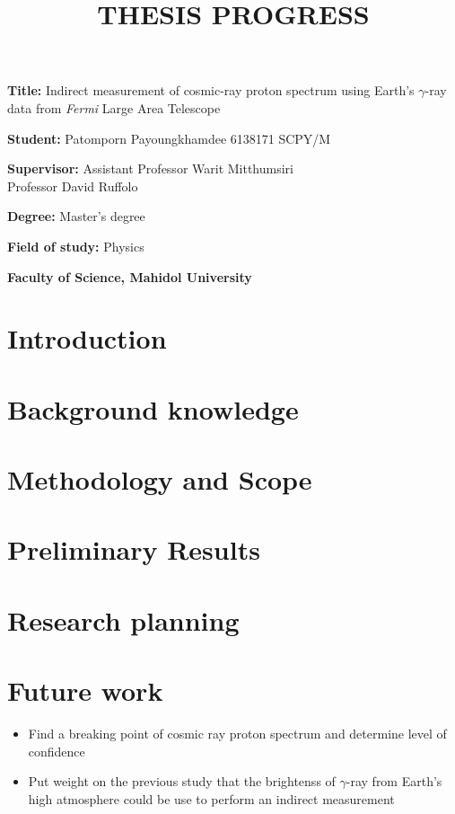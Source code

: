 \documentclass[12pt, a4paper]{article}
\title{THESIS PROGRESS}
\author{}
\date{}
\newcommand{\namelistlabel}[1]{\mbox{#1}\hfil}
\newenvironment{namelist}[1]{%
\begin{list}{}
    {
        \let\makelabel\namelistlabel
        \settowidth{\labelwidth}{#1}
        \setlength{\leftmargin}{1.1\labelwidth}
    }
  }{%
\end{list}}
\begin{document}
\maketitle

\begin{namelist}{xxxxxxxxxxxx}
\item[{\bf Title:}]
Indirect measurement of cosmic-ray proton spectrum using Earth's $\gamma$-ray data from \textit{Fermi} Large Area Telescope
\item[{\bf Student:}]
	Patomporn Payoungkhamdee 6138171 SCPY/M
\item[{\bf Supervisor:}]
  Assistant Professor Warit Mitthumsiri \\
  Professor David Ruffolo
\item[{\bf Degree:}]
	Master's degree
\item[{\bf Field of study:}]
	Physics
\item[{\bf Faculty of Science,  Mahidol University }]
\end{namelist}

\section{Introduction}


\section{Background knowledge}


\section{Methodology and Scope}


\section{Preliminary Results}


\newpage 
\section{Research planning}


\section{Future work}
\begin{itemize}
  \item Find a breaking point of cosmic ray proton spectrum and determine level of confidence
  \item Put weight on the previous study that the brightenss of $\gamma$-ray from Earth's high atmosphere could be use to perform an indirect measurement
\end{itemize}



\end{document}
